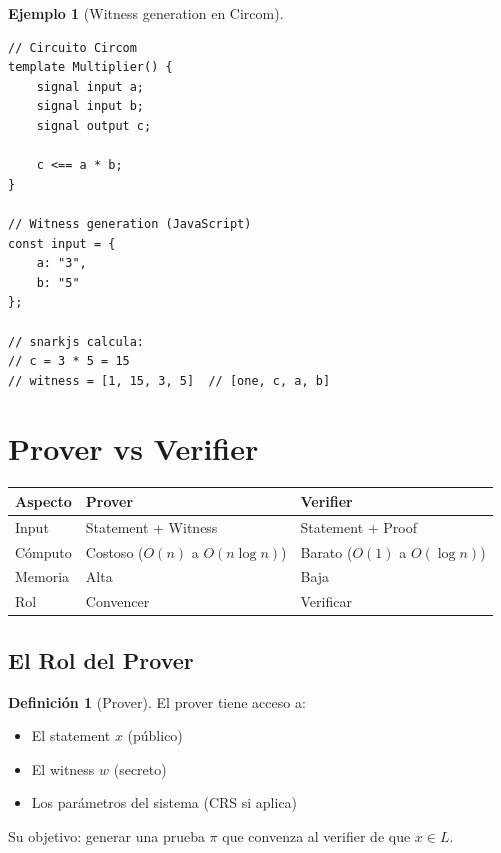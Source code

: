 \documentclass[11pt,a4paper,twoside,openright]{book}
\theoremstyle{definition}
\newtheorem{definition}{Definición}[chapter]
\newtheorem{example}{Ejemplo}[chapter]
\theoremstyle{plain}
\theoremstyle{remark}
\begin{document}
\begin{example}[Witness generation en Circom]
\begin{verbatim}
// Circuito Circom
template Multiplier() {
    signal input a;
    signal input b;
    signal output c;
    
    c <== a * b;
}

// Witness generation (JavaScript)
const input = {
    a: "3",
    b: "5"
};

// snarkjs calcula:
// c = 3 * 5 = 15
// witness = [1, 15, 3, 5]  // [one, c, a, b]
\end{verbatim}
\end{example}

\section{Prover vs Verifier}

\begin{table}[htbp]
\centering
\begin{tabular}{lll}
\toprule
\textbf{Aspecto} & \textbf{Prover} & \textbf{Verifier} \\
\midrule
Input & Statement + Witness & Statement + Proof \\
Cómputo & Costoso ($O(n)$ a $O(n \log n)$) & Barato ($O(1)$ a $O(\log n)$) \\
Memoria & Alta & Baja \\
Rol & Convencer & Verificar \\
\bottomrule
\end{tabular}
\end{table}

\subsection{El Rol del Prover}

\begin{definition}[Prover]
El prover tiene acceso a:
\begin{itemize}
    \item El statement $x$ (público)
    \item El witness $w$ (secreto)
    \item Los parámetros del sistema (CRS si aplica)
\end{itemize}

Su objetivo: generar una prueba $\pi$ que convenza al verifier de que $x \in L$.
\end{definition}
\end{document}
